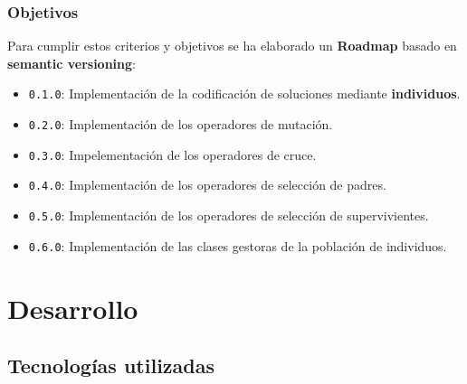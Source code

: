 \documentclass{beamer}
\begin{document}
\begin{frame}
\frametitle{Objetivos}

Para cumplir estos criterios y objetivos se ha elaborado un \textbf{Roadmap} basado en \textbf{semantic versioning}:

\bigskip

\begin{itemize}
    \item \texttt{0.1.0}: Implementación de la codificación de soluciones mediante \textbf{individuos}.
    \item \texttt{0.2.0}: Implementación de los operadores de mutación.
    \item \texttt{0.3.0}: Impelementación de los operadores de cruce.
    \item \texttt{0.4.0}: Implementación de los operadores de selección de padres. 
    \item \texttt{0.5.0}: Implementación de los operadores de selección de supervivientes.
    \item \texttt{0.6.0}: Implementación de las clases gestoras de la población de individuos.
\end{itemize}

\end{frame}

\section{Desarrollo}


\subsection{Tecnologías utilizadas}
\end{document}
